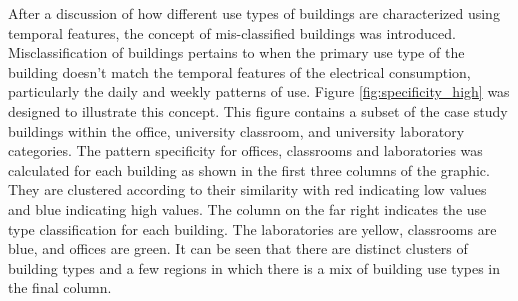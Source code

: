 After a discussion of how different use types of buildings are characterized using temporal features, the concept of mis-classified buildings was introduced. Misclassification of buildings pertains to when the primary use type of the building doesn't match the temporal features of the electrical consumption, particularly the daily and weekly patterns of use. Figure \ref{fig:specificity_high} was designed to illustrate this concept. This figure contains a subset of the case study buildings within the office, university classroom, and university laboratory categories. The pattern specificity for offices, classrooms and laboratories was calculated for each building as shown in the first three columns of the graphic. They are clustered according to their similarity with red indicating low values and blue indicating high values. The column on the far right indicates the use type classification for each building. The laboratories are yellow, classrooms are blue, and offices are green. It can be seen that there are distinct clusters of building types and a few regions in which there is a mix of building use types in the final column. 